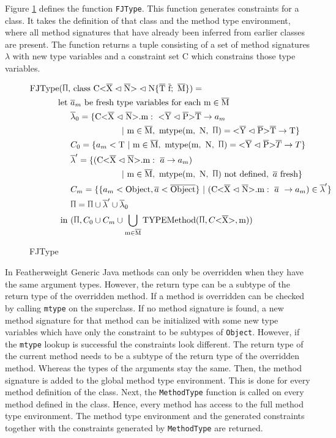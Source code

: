 Figure \ref{fjtype} defines the function \verb|FJType|. This function generates constraints for a class. It takes the definition of that class and the method type environment, where all method signatures that have already been inferred from earlier classes are present.
The function returns a tuple consisting of a set of method signatures $\lambda$ with new type variables and a constraint set C which constrains those type variables.

\begin{figure}[tp]
    \begin{align*}
        \text{FJType}(\sprod{0.7}, & \ \classheader \{ \ot{T} \ \ot{f}; \ \ot{M} \}) = \\
        \text{let} \ & \overline{a}_m \ \text{be fresh type variables for each m} \in \ot{M} \\
        & \overline{\lambda}_0 = \{\cm : \ \yp \ot{T} \to a_m \\
        & \quad \quad \quad \quad \quad \quad | \ \text{m} \in \ot{M}, \ \mtype = \yp \ot{T} \to \text{T} \}\\
        & C_0 = \{ a_m < \text{T} \ | \ \text{m} \in \ot{M}, \ \mtype = \yp \oto{T} \}\\
        & \overline{\lambda}' = \{ ( \cm : \ \overline{a} \to a_m ) \\
        & \quad \quad \quad \quad \quad \quad | \ \text{m} \in \ot{M}, \ \mtype \ \text{not defined}, \ \fresh{\overline{a}} \}\\
        & C_m = \{\{ a_m < \text{Object}, \overline{a} < \ot{Object} \} \ | \ ( \cm : \ \overline{a} \ \to a_m) \in \overline{\lambda}' \} \\
        & \sprod{0.7} = \sprod{0.7} \cup \overline{\lambda}' \cup \overline{\lambda}_0\\
    \text{in} \ &(\sprod{0.7}, C_0 \cup C_m \cup \bigcup_{ \text{m} \in \ot{M} } \text{TYPEMethod}(\sprod{0.7}, C \vv{\ot{X}}, \text{m}))\\
    \end{align*}
    \caption{FJType}
    \label{fjtype}
\end{figure}

In Featherweight Generic Java methods can only be overridden when they have the same argument types. However, the return type can be a subtype of the return type of the overridden method. If a method is overridden can be checked by calling \verb|mtype| on the superclass.
If no method signature is found, a new method signature for that method can be initialized with some new type variables which have only the constraint to be subtypes of \verb|Object|.
However, if the \verb|mtype| lookup is successful the constraints look different. The return type of the current method needs to be a subtype of the return type of the overridden method.
Whereas the types of the arguments stay the same. Then, the method signature is added to the global method type environment.
This is done for every method definition of the class. Next, the \verb|MethodType| function is called on every method defined in the class. Hence, every method has access to the full method type environment.
The method type environment and the generated constraints together with the constraints generated by \verb|MethodType| are returned.

